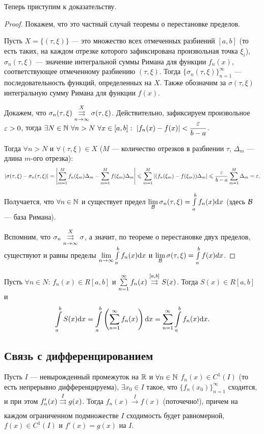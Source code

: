 \documentclass[a4paper, 12pt]{article}
\begin{document}
Теперь приступим к доказательству.
\begin{proof}
Покажем, что это частный случай теоремы о перестановке пределов.

Пусть $X = \{(\tau, \xi) \}$ --- это множество всех отмеченных разбиений $[a, b]$ (то есть таких, на каждом отрезке которого зафиксирована произвольная точка $\xi_i$), $\sigma_n(\tau, \xi)$ --- значение интегральной суммы Римана для функции $f_n(x)$, соответствующее отмеченному разбиению $(\tau, \xi)$. Тогда $\{\sigma_n(\tau, \xi) \}_{n=1}^\infty$ --- последовательность функций, определенных на $X$. Также обозначим за $\sigma(\tau, \xi)$ интегральную сумму Римана для функции $f(x)$.

Докажем, что $\sigma_n(\tau, \xi) \overset{X}{\underset{n \to \infty}{\rightrightarrows}} \sigma(\tau, \xi)$. Действительно, зафиксируем произвольное $\varepsilon > 0$, тогда $\exists N \in \N\ \forall n > N\ \forall x \in[a, b]:\ |f_n(x) - f(x)| < \dfrac{\eps}{b-a}$.

Тогда $\forall n > N$ и $\forall (\tau, \xi) \in X$ ($M$ --- количество отрезков в разбиении $\tau$, $\Delta_m$ --- длина $m$-ого отрезка):
\begin{gather}
|\sigma(\tau, \xi) - \sigma_n(\tau, \xi)| = \left| \sum\limits_{m=1}^{M}f_n(\xi_m)\Delta_m - \sum\limits_{m=1}^{M}f(\xi_m)\Delta_m \right| \leqslant \sum\limits_{m=1}^M \left| (f_n(\xi_m) - f(\xi_m))\Delta_m \right| \leqslant \frac{\varepsilon}{b-a}\sum\limits_{m=1}^M \Delta_m = \varepsilon.
\end{gather}

Получается, что $\forall n \in \mathbb{N}$ и существует предел $\lim\limits_{\mathcal{B}} \sigma_n(\tau, \xi) = \int\limits_a^bf_n(x)\mathrm{d}x$ (здесь $\mathcal{B}$ --- база Римана).

Вспомним, что $\sigma_n \overset{X}{\underset{n \to \infty}{\rightrightarrows}} \sigma$, а значит, по теореме о перестановке двух пределов, существуют и равны пределы $\lim\limits_{n \to \infty} \int\limits_a^b f_n(x) \mathrm{d}x$ и $\lim\limits_{\mathcal{B}}\sigma(\tau, \xi) = \int\limits_a^bf(x)dx$.
\end{proof}

\begin{Consequence}
Пусть $\forall n \in N$: $f_n(x) \in R[a, b]$ и $\sum\limits_{n=1}^{\infty} f_n(x) \overset{[a, b]}{\underset{}{\rightrightarrows}} S(x)$. Тогда $S(x) \in R[a, b]$ и 
$$
\int\limits_a^bS(x) \mathrm{d}x = \int\limits_a^b \left(\sum\limits_{n=1}^{\infty} f_n(x)\right) \mathrm{d}x = \sum\limits_{n=1}^{\infty} \int\limits_a^b f_n(x)\mathrm{d}x.
$$
\end{Consequence}

\subsection{Связь с дифференцированием}
\begin{Statement}
Пусть $I$ --- невырожденный промежуток на $\mathbb{R}$ и $\forall n \in \mathbb{N}$ $f_n(x) \in C^1(I)$ (то есть непрерывно дифференцируема), $\exists x_0 \in I$ такое, что $\{f_n(x_0) \}_{n=1}^\infty$ сходится, и при этом $f'_n(x) \overset{I}{\underset{}{\rightrightarrows}}g(x)$.
Тогда $f_n(x) \overset{I}{\to} f(x)$ (поточечно!), причем на каждом ограниченном подмножестве $I$ сходимость будет равномерной, $f(x) \in C^1(I)$ и $f'(x) = g(x)$ на $I$.
\end{Statement}
\end{document}

